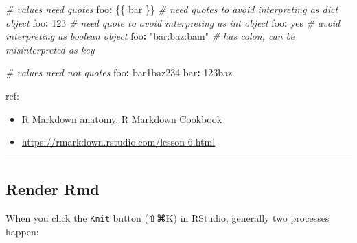\documentclass[
  a4paper,
  twoside,
  openright]{book}
\newenvironment{Shaded}{\begin{snugshade}}{\end{snugshade}}
\newcommand{\CommentTok}[1]{\textcolor[rgb]{0.56,0.35,0.01}{\textit{#1}}}
\newcommand{\DecValTok}[1]{\textcolor[rgb]{0.00,0.00,0.81}{#1}}
\newcommand{\NormalTok}[1]{#1}
\newcommand{\SpecialCharTok}[1]{\textcolor[rgb]{0.81,0.36,0.00}{\textbf{#1}}}
\newcommand{\StringTok}[1]{\textcolor[rgb]{0.31,0.60,0.02}{#1}}
\providecommand{\tightlist}{%
  \setlength{\itemsep}{0pt}\setlength{\parskip}{0pt}}
\theoremstyle{definition}
\theoremstyle{definition}
\theoremstyle{definition}
\theoremstyle{definition}
\theoremstyle{remark}
\begin{document}
\begin{Shaded}
\begin{Highlighting}[]
\CommentTok{\# values need quotes}
\NormalTok{foo}\SpecialCharTok{:} \StringTok{\textquotesingle{}\{\{ bar \}\}\textquotesingle{}} \CommentTok{\# need quotes to avoid interpreting as \textasciigrave{}dict\textasciigrave{} object}
\NormalTok{foo}\SpecialCharTok{:} \StringTok{\textquotesingle{}123\textquotesingle{}}       \CommentTok{\# need quote to avoid interpreting as \textasciigrave{}int\textasciigrave{} object}
\NormalTok{foo}\SpecialCharTok{:} \StringTok{\textquotesingle{}yes\textquotesingle{}}           \CommentTok{\# avoid interpreting as \textasciigrave{}boolean\textasciigrave{} object}
\NormalTok{foo}\SpecialCharTok{:} \StringTok{"bar:baz:bam"} \CommentTok{\# has colon, can be misinterpreted as key}

\CommentTok{\# values need not quotes}
\NormalTok{foo}\SpecialCharTok{:}\NormalTok{ bar1baz234}
\NormalTok{bar}\SpecialCharTok{:} \DecValTok{123}\NormalTok{baz}
\end{Highlighting}
\end{Shaded}

ref:

\begin{itemize}
\tightlist
\item
  \href{https://bookdown.org/yihui/rmarkdown-cookbook/rmarkdown-anatomy.html\#:~:text=In\%20short\%2C\%20we\%20can\%20include\%20variables\%20and\%20R\%20expressions\%20in\%20this\%20header\%20that\%20can\%20be\%20referenced\%20throughout\%20our\%20R\%20Markdown\%20document.}{R Markdown anatomy, R Markdown Cookbook}
\item
  \url{https://rmarkdown.rstudio.com/lesson-6.html}
\end{itemize}

\begin{center}\rule{0.5\linewidth}{0.5pt}\end{center}

\subsection{Render Rmd}\label{render-rmd}

When you click the \texttt{Knit} button (⇧⌘K) in RStudio, generally two processes happen:
\end{document}
